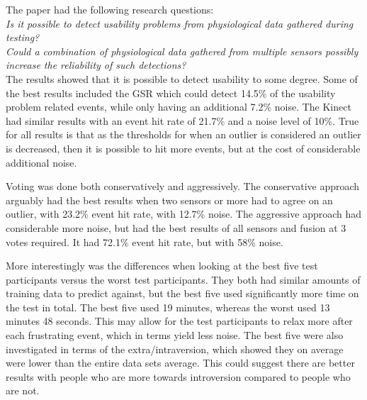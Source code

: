 The paper had the following research questions:\\

\textit{Is it possible to detect usability problems from physiological data gathered during testing?}\\

\textit{Could a combination of physiological data gathered from multiple sensors possibly increase the reliability of such detections?}\\

The results showed that it is possible to detect usability to some degree. 
Some of the best results included the GSR which could detect 14.5\% of the usability problem related events, while only having an additional 7.2\% noise. 
The Kinect had similar results with an event hit rate of 21.7\% and a noise level of 10\%. 
True for all results is that as the thresholds for when an outlier is considered an outlier is decreased, then it is possible to hit more events, but at the cost of considerable additional noise.

Voting was done both conservatively and aggressively.
The conservative approach arguably had the best results when two sensors or more had to agree on an outlier, with 23.2\% event hit rate, with 12.7\% noise.
The aggressive approach had considerable more noise, but had the best results of all sensors and fusion at 3 votes required.
It had 72.1\% event hit rate, but with 58\% noise.

More interestingly was the differences when looking at the best five test participants versus the worst test participants. 
They both had similar amounts of training data to predict against, but the best five used significantly more time on the test in total.
The best five used 19 minutes, whereas the worst used 13 minutes 48 seconds. 
This may allow for the test participants to relax more after each frustrating event, which in terms yield less noise. 
The best five were also investigated in terms of the extra/intraversion, which showed they on average were lower than the entire data sets average. 
This could suggest there are better results with people who are more towards introversion compared to people who are not.  
